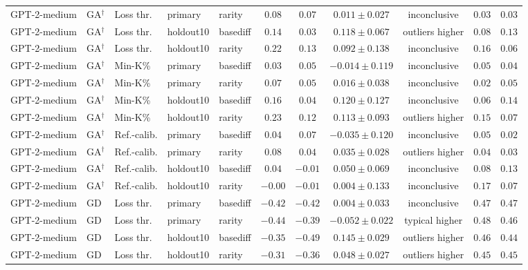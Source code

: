 {\begin{longtable}{@{\extracolsep{\fill}}lllllcccccc@{}}
GPT-2-medium & GA$^{\dagger}$ & Loss thr. & primary & rarity & $0.08$ & $0.07$ & $0.011 \pm 0.027$ & inconclusive & $0.03$ & $0.03$ \\
GPT-2-medium & GA$^{\dagger}$ & Loss thr. & holdout10 & basediff & $0.14$ & $0.03$ & $0.118 \pm 0.067$ & outliers higher & $0.08$ & $0.13$ \\
GPT-2-medium & GA$^{\dagger}$ & Loss thr. & holdout10 & rarity & $0.22$ & $0.13$ & $0.092 \pm 0.138$ & inconclusive & $0.16$ & $0.06$ \\
GPT-2-medium & GA$^{\dagger}$ & Min-K\% & primary & basediff & $0.03$ & $0.05$ & $-0.014 \pm 0.119$ & inconclusive & $0.05$ & $0.04$ \\
GPT-2-medium & GA$^{\dagger}$ & Min-K\% & primary & rarity & $0.07$ & $0.05$ & $0.016 \pm 0.038$ & inconclusive & $0.02$ & $0.05$ \\
GPT-2-medium & GA$^{\dagger}$ & Min-K\% & holdout10 & basediff & $0.16$ & $0.04$ & $0.120 \pm 0.127$ & inconclusive & $0.06$ & $0.14$ \\
GPT-2-medium & GA$^{\dagger}$ & Min-K\% & holdout10 & rarity & $0.23$ & $0.12$ & $0.113 \pm 0.093$ & outliers higher & $0.15$ & $0.07$ \\
GPT-2-medium & GA$^{\dagger}$ & Ref.-calib. & primary & basediff & $0.04$ & $0.07$ & $-0.035 \pm 0.120$ & inconclusive & $0.05$ & $0.02$ \\
GPT-2-medium & GA$^{\dagger}$ & Ref.-calib. & primary & rarity & $0.08$ & $0.04$ & $0.035 \pm 0.028$ & outliers higher & $0.04$ & $0.03$ \\
GPT-2-medium & GA$^{\dagger}$ & Ref.-calib. & holdout10 & basediff & $0.04$ & $-0.01$ & $0.050 \pm 0.069$ & inconclusive & $0.08$ & $0.13$ \\
GPT-2-medium & GA$^{\dagger}$ & Ref.-calib. & holdout10 & rarity & $-0.00$ & $-0.01$ & $0.004 \pm 0.133$ & inconclusive & $0.17$ & $0.07$ \\
GPT-2-medium & GD & Loss thr. & primary & basediff & $-0.42$ & $-0.42$ & $0.004 \pm 0.033$ & inconclusive & $0.47$ & $0.47$ \\
GPT-2-medium & GD & Loss thr. & primary & rarity & $-0.44$ & $-0.39$ & $-0.052 \pm 0.022$ & typical higher & $0.48$ & $0.46$ \\
GPT-2-medium & GD & Loss thr. & holdout10 & basediff & $-0.35$ & $-0.49$ & $0.145 \pm 0.029$ & outliers higher & $0.46$ & $0.44$ \\
GPT-2-medium & GD & Loss thr. & holdout10 & rarity & $-0.31$ & $-0.36$ & $0.048 \pm 0.027$ & outliers higher & $0.45$ & $0.45$ \\

\end{longtable}}
